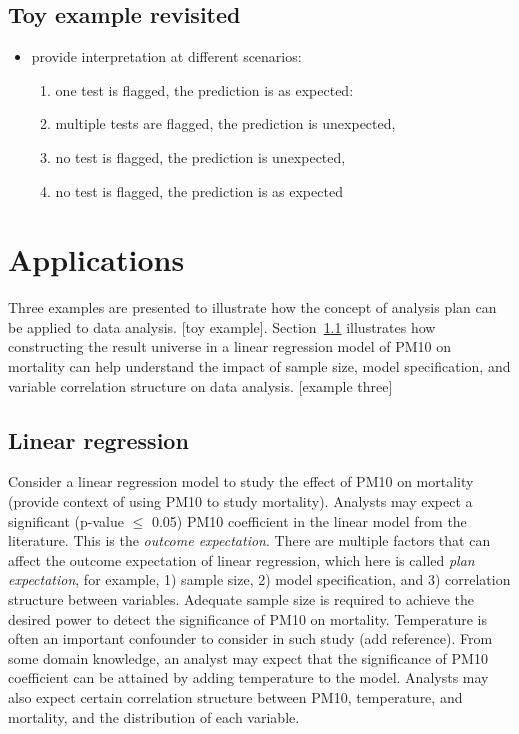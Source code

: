 \documentclass[
]{jds}
\providecommand{\tightlist}{%
  \setlength{\itemsep}{0pt}\setlength{\parskip}{0pt}}\usepackage{longtable,booktabs,array}
\begin{document}
\subsection{Toy example revisited}\label{toy-example-revisited}

\begin{itemize}
\item
  provide interpretation at different scenarios:

  \begin{enumerate}
  \def\labelenumi{\arabic{enumi})}
  \tightlist
  \item
    one test is flagged, the prediction is as expected:
  \item
    multiple tests are flagged, the prediction is unexpected,
  \item
    no test is flagged, the prediction is unexpected,
  \item
    no test is flagged, the prediction is as expected
  \end{enumerate}
\end{itemize}

\section{Applications}\label{sec-examples}

Three examples are presented to illustrate how the concept of analysis
plan can be applied to data analysis. {[}toy example{]}.
Section~\ref{sec-linear-reg} illustrates how constructing the result
universe in a linear regression model of PM10 on mortality can help
understand the impact of sample size, model specification, and variable
correlation structure on data analysis. {[}example three{]}

\subsection{Linear regression}\label{sec-linear-reg}

Consider a linear regression model to study the effect of PM10 on
mortality (provide context of using PM10 to study mortality). Analysts
may expect a significant (p-value \(\le\) 0.05) PM10 coefficient in the
linear model from the literature. This is the \emph{outcome
expectation}. There are multiple factors that can affect the outcome
expectation of linear regression, which here is called \emph{plan
expectation}, for example, 1) sample size, 2) model specification, and
3) correlation structure between variables. Adequate sample size is
required to achieve the desired power to detect the significance of PM10
on mortality. Temperature is often an important confounder to consider
in such study (add reference). From some domain knowledge, an analyst
may expect that the significance of PM10 coefficient can be attained by
adding temperature to the model. Analysts may also expect certain
correlation structure between PM10, temperature, and mortality, and the
distribution of each variable.
\end{document}
